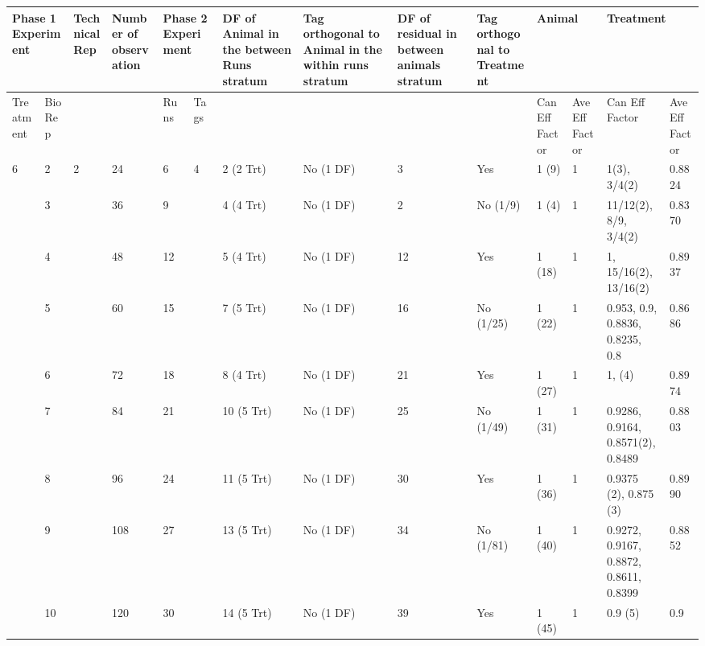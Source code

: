 \noindent \eject 

\begin{tabular}{|p{0.5in}|p{0.3in}|p{0.5in}|p{0.7in}|p{0.3in}|p{0.3in}|p{0.7in}|p{0.7in}|p{0.6in}|p{0.6in}|p{0.4in}|p{0.4in}|p{0.6in}|p{0.4in}|} \hline 
\multicolumn{2}{|p{1in}|}{Phase 1 Experiment} & Technical Rep & Number of observation  & \multicolumn{2}{|p{0.7in}|}{Phase 2 Experiment} & DF of Animal in the between Runs stratum  & Tag orthogonal to Animal in the within runs stratum & DF of residual in between animals stratum & Tag orthogonal to Treatment & \multicolumn{2}{|p{0.8in}|}{Animal} & \multicolumn{2}{|p{1.0in}|}{Treatment} \\ \hline 
Treatment & Bio Rep &  &  & Runs & Tags  &  &  &  &  & Can Eff Factor & Ave Eff Factor & Can Eff Factor & Ave Eff Factor \\ \hline 
6 & 2 & 2 & 24 & 6 & 4 & 2 (2 Trt) & No (1 DF) & 3 & Yes & 1 (9) & 1 & 1(3), 3/4(2) & 0.8824 \\ \hline 
 & 3 &  & 36 & 9 &  & 4 (4 Trt) & No (1 DF) & 2 & No (1/9) & 1 (4) & 1 & 11/12(2), 8/9, 3/4(2)  & 0.8370 \\ \hline 
 & 4 &  & 48 & 12 &  & 5 (4 Trt) & No (1 DF) & 12 & Yes & 1 (18) & 1 & 1, 15/16(2), 13/16(2) & 0.8937 \\ \hline 
 & 5 &  & 60 & 15 &  & 7 (5 Trt) & No (1 DF) & 16 & No (1/25) & 1 (22) & 1 & 0.953, 0.9, 0.8836, 0.8235, 0.8 & 0.8686 \\ \hline 
 & 6 &  & 72 & 18 &  & 8 (4 Trt) & No (1 DF) & 21 & Yes & 1 (27) & 1 & 1,  \newline 0.875 (4)  & 0.8974 \\ \hline 
 & 7 &  & 84 & 21 &  & 10 (5 Trt) & No (1 DF) & 25 & No (1/49) & 1 (31) & 1 & 0.9286, 0.9164, 0.8571(2),  0.8489 & 0.8803 \\ \hline 
 & 8 &  & 96 & 24 &  & 11 (5 Trt) & No (1 DF) & 30 & Yes & 1 (36) & 1 & 0.9375 (2), 0.875 (3)  & 0.8990 \\ \hline 
 & 9 &  & 108 & 27 &  & 13 (5 Trt) & No (1 DF) & 34 & No (1/81) & 1 (40) & 1 & 0.9272, 0.9167, 0.8872, 0.8611, 0.8399 & 0.8852 \\ \hline 
 & 10 &  & 120 & 30 &  & 14 (5 Trt) & No (1 DF) & 39 & Yes & 1 (45) & 1 & 0.9 (5) & 0.9 \\ \hline 
\end{tabular}



\noindent \eject 

